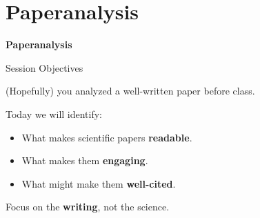\documentclass{beamer}
\begin{document}

\section{Paperanalysis}

\begin{frame}
  \centering
  \vfill
  {\Large\bfseries Paperanalysis}
  \vfill
\end{frame}




\begin{frame}{Session Objectives}

(Hopefully) you analyzed a well-written paper before class.

\vspace{0.5cm}

Today we will identify:

\begin{itemize}
\item What makes scientific papers \textbf{readable}.
\item What makes them \textbf{engaging}.
\item What might make them \textbf{well-cited}.
\end{itemize}

\vspace{0.5cm}

\center
Focus on the \textbf{writing}, not the science.
\vspace{0.5cm}
\scriptsize
\tableofcontents
\end{frame}


\end{document}
